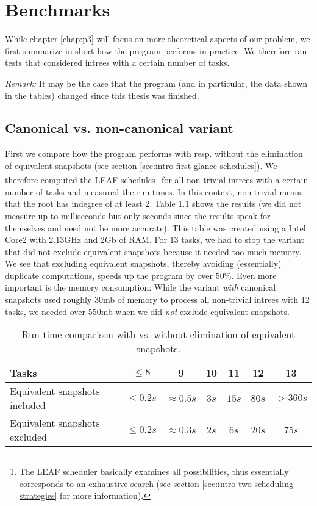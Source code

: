 \chapter{Benchmarks}
\label{chap:benchmarks}

While chapter \ref{chap:p3} will focus on more theoretical aspects of our problem, we first summarize in short how the program performs in practice. We therefore ran tests that considered intrees with a certain number of tasks.

\emph{Remark:} It may be the case that the program (and in particular, the data shown in the tables) changed since this thesis was finished.

\section{Canonical vs. non-canonical variant}
\label{sec:benchmark-canonical-vs-non-canonical}

First we compare how the program performs with resp. without the elimination of equivalent snapshots (see section \ref{sec:intro-first-glance-schedules}). We therefore computed the LEAF schedules\footnote{The LEAF scheduler basically examines all possibilities, thus essentially corresponds to an exhaustive search (see section \ref{sec:intro-two-scheduling-strategies} for more information).} for all non-trivial intrees with a certain number of tasks and measured the run times. In this context, non-trivial means that the root has indegree of at least 2. Table \ref{tab:comparison-canonical-vs-non-canonical} shows the results (we did not measure up to milliseconds but only seconds since the results speak for themselves and need not be more accurate). This table was created using a Intel Core2 with 2.13GHz and 2Gb of RAM. For 13 tasks, we had to stop the variant that did not exclude equivalent snapshots because it needed too much memory. We see that excluding equivalent snapshots, thereby avoiding (essentially) duplicate computations, speeds up the program by over $50\%$.
Even more important is the memory consumption: While the variant \emph{with} canonical snapshots used roughly 30mb of memory to process all non-trivial intrees with 12 tasks, we needed over 550mb when we did \emph{not} exclude equivalent snapshots.

\begin{table}[th]
  \centering
  \begin{tabular}[ht]{lcccccc}
    Tasks                         & $\leq 8$    & 9 & 10 & 11 & 12 & 13 \\
    \hline
    Equivalent snapshots included & $\leq 0.2s$ & $\approx 0.5s$ & $3s$ & $15s$ & $80s$ & $>360s$ \\
    Equivalent snapshots excluded & $\leq 0.2s$ & $\approx 0.3s$ & $2s$ & $6s$ & $20s$ & $75s$
  \end{tabular}
  \caption{Run time comparison with vs. without elimination of equivalent snapshots.}
  \label{tab:comparison-canonical-vs-non-canonical}
\end{table}


